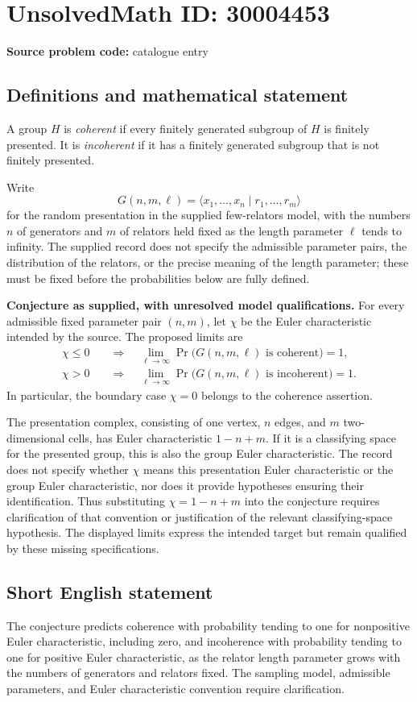 \documentclass[11pt]{article}
\begin{document}
\section*{UnsolvedMath ID: 30004453}
\textbf{Source problem code:} catalogue entry
\subsection{Definitions and mathematical statement}
A group \(H\) is \emph{coherent} if every finitely generated subgroup of \(H\) is finitely presented. It is \emph{incoherent} if it has a finitely generated subgroup that is not finitely presented.

Write
\[
G(n,m,\ell)=\langle x_1,\ldots,x_n\mid r_1,\ldots,r_m\rangle
\]
for the random presentation in the supplied few-relators model, with the numbers \(n\) of generators and \(m\) of relators held fixed as the length parameter \(\ell\) tends to infinity. The supplied record does not specify the admissible parameter pairs, the distribution of the relators, or the precise meaning of the length parameter; these must be fixed before the probabilities below are fully defined.

\textbf{Conjecture as supplied, with unresolved model qualifications.} For every admissible fixed parameter pair \((n,m)\), let \(\chi\) be the Euler characteristic intended by the source. The proposed limits are
\[
\begin{aligned}
\chi\leq 0&\quad\Longrightarrow\quad
\lim_{\ell\to\infty}\Pr\bigl(G(n,m,\ell)\text{ is coherent}\bigr)=1,\\
\chi>0&\quad\Longrightarrow\quad
\lim_{\ell\to\infty}\Pr\bigl(G(n,m,\ell)\text{ is incoherent}\bigr)=1.
\end{aligned}
\]
In particular, the boundary case \(\chi=0\) belongs to the coherence assertion.

The presentation complex, consisting of one vertex, \(n\) edges, and \(m\) two-dimensional cells, has Euler characteristic \(1-n+m\). If it is a classifying space for the presented group, this is also the group Euler characteristic. The record does not specify whether \(\chi\) means this presentation Euler characteristic or the group Euler characteristic, nor does it provide hypotheses ensuring their identification. Thus substituting \(\chi=1-n+m\) into the conjecture requires clarification of that convention or justification of the relevant classifying-space hypothesis. The displayed limits express the intended target but remain qualified by these missing specifications.
\subsection{Short English statement}
The conjecture predicts coherence with probability tending to one for nonpositive Euler characteristic, including zero, and incoherence with probability tending to one for positive Euler characteristic, as the relator length parameter grows with the numbers of generators and relators fixed. The sampling model, admissible parameters, and Euler characteristic convention require clarification.
\end{document}

